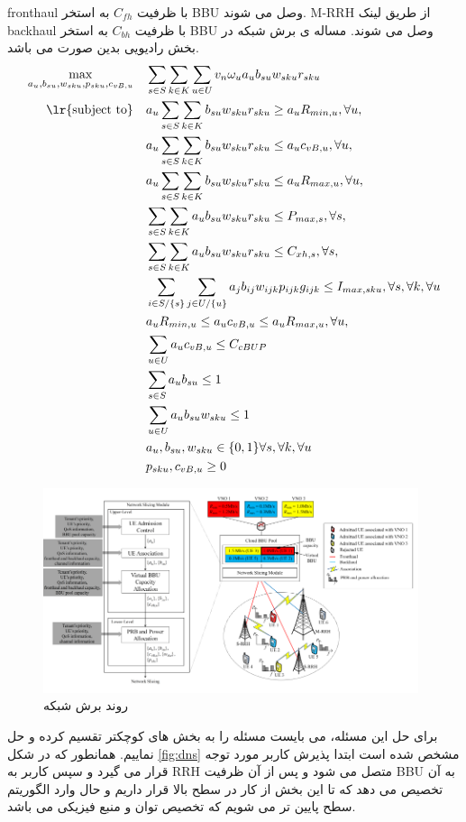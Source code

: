 fronthaul
 با ظرفیت
 $C_{fh}$
  به استخر BBU 
  وصل می شوند.
  M-RRH
   از طریق لینک
   backhaul
    با ظرفیت 
    $C_{bh}$ 
     به استخر BBU 
  وصل می شوند.
  مساله ی برش شبکه در بخش رادیویی بدین صورت می باشد.
\begin{equation}
\begin{aligned}
\max\limits_{a_u,b_{su},w_{sku},p_{sku},c_{vB,u}}   \quad &  \sum_{s\in S} \sum_{k\in K} \sum_{u\in U}
v_n \omega_u a_u b_{su} w_{sku} r_{sku} \\
\text{\lr{subject to}} \quad  & a_u\sum_{s\in S} \sum_{k\in K}  b_{su} w_{sku} r_{sku} \geq a_u R_{min,u} , \forall u,   \\
& a_u\sum_{s\in S} \sum_{k\in K}  b_{su} w_{sku} r_{sku} \leq a_u c_{vB,u}  , \forall u,   \\
& a_u\sum_{s\in S} \sum_{k\in K}  b_{su} w_{sku} r_{sku} \leq a_u R_{max,u}  , \forall u,   \\
& \sum_{s\in S} \sum_{k\in K} a_u b_{su} w_{sku} r_{sku} \leq P_{max,s}  , \forall s,   \\
& \sum_{s\in S} \sum_{k\in K} a_u b_{su} w_{sku} r_{sku} \leq C_{xh,s}  , \forall s,   \\
&\sum_{i\in S/\{s\}}\sum_{j\in U/\{u\}}a_j b_{ij}w_{ijk}p_{ijk}g_{ijk} \leq I_{max,sku}  , \forall s, \forall k, \forall u   \\
& a_u R_{min,u} \leq a_u c_{vB,u} \leq a_u R_{max,u} , \forall u,   \\
& \sum_{u \in U} a_u c_{vB,u} \leq C_{cBUP} \\
& \sum_{s \in S} a_u b_{su} \leq 1 \\ 
& \sum_{u \in U} a_u b_{su} w_{sku} \leq 1 \\ 
&  a_u, b_{su}, w_{sku} \in \{0,1\}  \forall s, \forall k, \forall u   \\ 
& p_{sku},c_{vB,u} \geq 0 \\
\end{aligned}	
\end{equation}
\begin{figure}[H]
  \centering
    \includegraphics[width=\linewidth, height=6cm]{./fig/dynamicNS}
  \caption{روند برش شبکه\ \cite{lee2018dynamic}}
  \label{fig:dns}
\end{figure}
برای حل این مسئله، می بایست مسئله را به بخش های کوچکتر تقسیم کرده و حل نماییم.
همانطور که در شکل \eqref{fig:dns} 
مشخص شده است ابتدا پذیرش کاربر مورد توجه قرار می گیرد و سپس کاربر به RRH متصل می شود و پس از آن ظرفیت BBU به آن تخصیص می دهد که تا این بخش از کار در سطح بالا قرار داریم و حال وارد الگوریتم سطح پایین تر می شویم که تخصیص توان و منبع فیزیکی می باشد.
